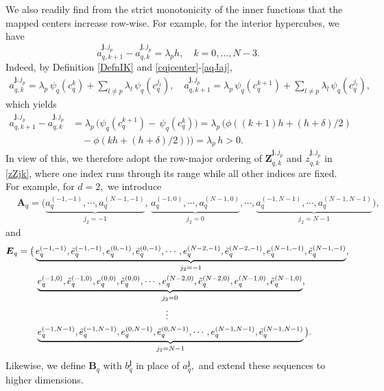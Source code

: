 \documentclass[10pt,reqno,final]{amsart}
\theoremstyle{remark}
\theoremstyle{definition}
\newcommand{\bs}[1]{\boldsymbol{#1}}
\begin{document}
We also readily find from the strict monotonicity of the inner functions that the mapped centers increase row-wise. For example, for the interior hypercubes, we have
\begin{equation}\label{distanceajj-00}
 a_{q,k+1}^{\bs j,j_p}-a_{q,k}^{\bs j,j_p}=\lambda_p h, \quad k=0,\ldots, N-3.
\end{equation} 
Indeed, by  Definition \ref{DefnIK} and \eqref{cqjcenter}-\eqref{aqJaj}, 
\[
\begin{split}
a_{q,k}^{\bs j,j_p}=\lambda_p\, \psi_q(c_q^{k})+\sum_{l\not=p} \lambda_l\, \psi_q(c_q^{j_l}),\quad 
a_{q,k+1}^{\bs j,j_p}=\lambda_p\, \psi_q(c_q^{k+1})+\sum_{l\not=p} \lambda_l\, \psi_q(c_q^{j_l}),
\end{split}
\]
which yields
\begin{equation*}
\begin{split}
a_{q,k+1}^{\bs j,j_p}-a_{q,k}^{\bs j,j_p} & =\lambda_{p}\,\big(\psi_q(c_q^{k+1})-\, \psi_q(c_q^{k})\big)= \lambda_{p}\,\big(\phi((k+1) h+(h+\delta)/2)\\ &\quad  -\phi(kh+(h+\delta)/2))\big)=\lambda_{p}\,h>0.
\end{split}
\end{equation*}
In view of this, we therefore adopt the row-major ordering of $\bs Z_{q,k}^{\bs j, j_p}$ and $z_{q,k}^{\bs j, j_p}$ in  \eqref{zZjk},   
where one index runs through its range while all other indices are fixed.   
For example, for $d=2,$ we introduce 
\begin{equation}\label{ufform}
\begin{split}
&{\bs A_q}=\big(\underbrace{a_q^{(-1,-1)},\cdots, a_q^{(N-1,-1)}}_{j_2=-1}, \, \underbrace{a_q^{(-1,0)},\cdots, a_q^{(N-1,0)}}_{j_2=0},\cdots,
\underbrace{a_q^{(-1,N-1)},\cdots, a_q^{(N-1,N-1)}}_{j_2=N-1}\big),
\end{split}
\end{equation} 
and 
\begin{align}
{\bs E_q} &=\big(\underbrace{e_q^{(-1,-1)}, \tilde e_q^{(-1,-1)}, e_q^{(0,-1)}, \tilde e_q^{(0,-1)},\cdots, e_q^{(N-2,-1)}, \tilde e_q^{(N-2,-1)}, e_q^{(N-1,-1)}, \tilde e_q^{(N-1,-1)}}_{j_2=-1}, \, \notag\\
&\qquad \underbrace{e_q^{(-1,0)}, \tilde e_q^{(-1,0)}, e_q^{(0,0)}, \tilde e_q^{(0,0)},\cdots, e_q^{(N-2,0)}, \tilde e_q^{(N-2,0)}, e_q^{(N-1,0)}, \tilde e_q^{(N-1,0)}}_{j_2=0}, \notag\\
&\qquad \hspace*{5cm} \vdots \notag \\
&\qquad \underbrace{e_q^{(-1,N-1)}, \tilde e_q^{(-1,N-1)}, e_q^{(0,N-1)}, \tilde e_q^{(0,N-1)}, \cdots, e_q^{(N-1,N-1)}, \tilde e_q^{(N-1,N-1)}}_{j_2=N-1}\big). \label{Efform-order}
\end{align}
Likewise, we define $\bs B_q$ with $b_q^{\bs j}$ in place of $a_q^{\bs j},$ and extend these sequences to higher dimensions.       
\end{document}
